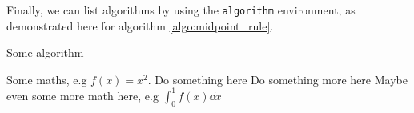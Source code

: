 \documentclass[english,notitlepage]{revtex4-1}  %
\begin{document}
Finally, we can list algorithms by using the \texttt{algorithm} environment, as demonstrated here for algorithm \ref{algo:midpoint_rule}.
\begin{algorithm}[H]
    \caption{Some algorithm}\label{algo:midpoint_rule}
    \begin{algorithmic}
        \State Some maths, e.g $f(x) = x^2$.  
        \State Do something here 
        \EndFor
        \State Do something more here 
        \EndWhile
        \State Maybe even some more math here, e.g $\int_0^1 f(x) \dd x$
    \end{algorithmic}
\end{algorithm}
   
\end{document}
